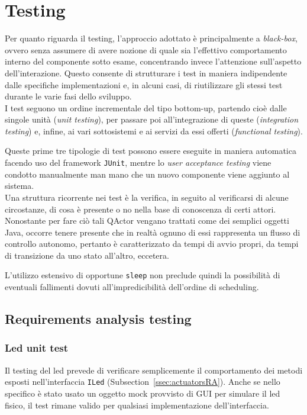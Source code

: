 \documentclass{../llncs}
\newcommand{\codescript}[1]{{\mbox{\small{\texttt{#1}}}}\xspace}
\newcommand{\labelsec}[1]{\label{sec:#1}}
\newcommand{\xss}[1]{\subsectionname~\ref{ssec:#1}}
\newcommand{\labelsssec}[1]{\label{sssec:#1}}
\newcommand{\subsectionname}{Subsection}
\begin{document}
\section{Testing}
\labelsec{Testing}

Per quanto riguarda il testing, l'approccio adottato è principalmente a \emph{black-box}, ovvero senza assumere di avere nozione di quale sia l'effettivo comportamento interno del componente sotto esame, concentrando invece l'attenzione sull'aspetto dell'interazione. Questo consente di strutturare i test in maniera indipendente dalle specifiche implementazioni e, in alcuni casi, di riutilizzare gli stessi test durante le varie fasi dello sviluppo.\\

I test seguono un ordine incrementale del tipo bottom-up, partendo cioè dalle singole unità (\emph{unit testing}), per passare poi all'integrazione di queste (\emph{integration testing}) e, infine, ai vari sottosistemi e ai servizi da essi offerti (\emph{functional testing}).

Queste prime tre tipologie di test possono essere eseguite in maniera automatica facendo uso del framework \texttt{JUnit}, mentre lo \emph{user acceptance testing} viene condotto manualmente man mano che un nuovo componente viene aggiunto al sistema.\\

Una struttura ricorrente nei test è la verifica, in seguito al verificarsi di alcune circostanze, di cosa è presente o no nella base di conoscenza di certi attori. Nonostante per fare ciò tali QActor vengano trattati come dei semplici oggetti Java, occorre tenere presente che in realtà ognuno di essi rappresenta un flusso di controllo autonomo, pertanto è caratterizzato da tempi di avvio propri, da tempi di transizione da uno stato all'altro, eccetera.

L'utilizzo estensivo di opportune \codescript{sleep} non preclude quindi la possibilità di eventuali fallimenti dovuti all'impredicibilità dell'ordine di scheduling.

\subsection{Requirements analysis testing}
\labelsssec{reqAnalTesting}

\subsubsection{Led unit test}
Il testing del led prevede di verificare semplicemente il comportamento dei metodi esposti nell'interfaccia \codescript{ILed} (\xss{actuatorsRA}). Anche se nello specifico è stato usato un oggetto mock provvisto di GUI per simulare il led fisico, il test rimane valido per qualsiasi implementazione dell'interfaccia.\\
\end{document}
